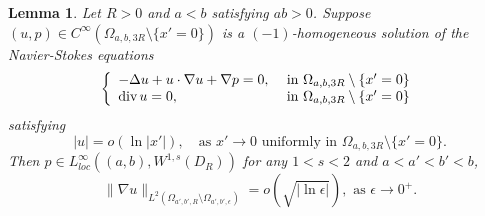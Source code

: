 \documentclass[12pt]{article}
\newtheorem{lem}{Lemma}[section]
\newcommand{\dive}{{\rm div \hspace{0.05cm} }}
\begin{document}
\begin{lem}\label{lem:2_3}
	Let $R>0$ and $a<b$ satisfying $ab>0$. Suppose $(u,p)\in C^{\infty}(\Omega_{a, b, 3R}\setminus\{x'=0\})$ is a $(-1)$-homogeneous solution of the Navier-Stokes equations 
	\begin{equation}\label{eq:lem:2_3:1}
	\left\{
		\begin{array}{ll}
			 -\Delta u+u\cdot \nabla u + \nabla p=0, & \textrm{ in }\Omega_{a, b, 3R}\setminus\{x'=0\}\\
			\dive u=0, & \textrm{ in }\Omega_{a, b, 3R}\setminus\{x'=0\}
		\end{array}
	\right.
	\end{equation}
	satisfying 
	\begin{equation}\label{eq:lem:2_3:2}
		|u|=o(\ln |x'|), \quad \textrm{as }x'\to 0\textrm{ uniformly in } \Omega_{a, b, 3R}\setminus\{x'=0\}. 
	\end{equation}
	Then $p\in L^{\infty}_{loc}((a, b), W^{1, s}(D_R))$ for any $1< s<2$ and $a<a'<b'<b$, 	
	\begin{equation}\label{eq:lem:2_3:3}
		\| \nabla u \|_{L^2(\Omega_{a', b', R}\setminus\Omega_{a', b', \epsilon})}=o(\sqrt{| \ln \epsilon|}), \textrm{ as }\epsilon\to 0^+. 
	\end{equation}
\end{lem}
\end{document}
